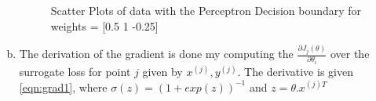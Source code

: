 \documentclass[a4paper, 11pt]{article}
\begin{document}
\begin{enumerate}[(a)]
\begin{figure}
\centering
{}
\caption[Scatter]{Scatter Plots of data with the Perceptron Decision boundary for weights = [0.5 1 -0.25]}
\label{fig:scatter2}
\end{figure}
\item The derivation of the gradient is done my computing the \(\frac{\partial J_j(\theta)}{\partial \theta_i}\) over the surrogate loss for point \(j\) given by \(x^{(j)}, y^{(j)}\). The derivative is given \autoref{eqn:grad1}, where \(\sigma(z) = (1 + exp(z))^{-1}\) and \(z = \theta.x^{(j)T}\)


\end{enumerate}
\end{document}

